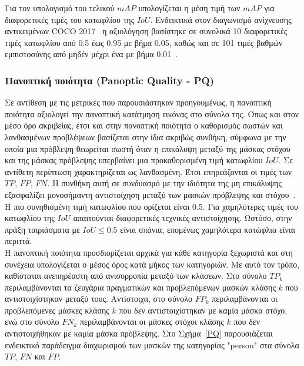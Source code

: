 \documentclass[12pt]{article}
\numberwithin{equation}{section}
\begin{document}
Για τον υπολογισμό του τελικού \(mAP\) υπολογίζεται η μέση τιμή των \(mAP\) για διαφορετικές τιμές του κατωφλίου της \(IoU\). Ενδεικτικά στον διαγωνισμό ανίχνευσης αντικειμένων COCO 2017~\cite{lin2015microsoftcococommonobjects} η αξιολόγηση βασίστηκε σε  συνολικά 10 διαφορετικές τιμές κατωφλίου από 0.5 έως 0.95 με βήμα 0.05, καθώς και σε 101 τιμές βαθμών εμπιστοσύνης από μηδέν μέχρι ένα με βήμα 0.01~\cite{shah2022map}. \\



\subsubsection{Πανοπτική ποιότητα (Panoptic Quality - PQ)}

Σε αντίθεση με τις μετρικές που παρουσιάστηκαν προηγουμένως, η πανοπτική ποιότητα αξιολογεί την πανοπτική κατάτμηση εικόνας στο σύνολο της. Όπως και στον μέσο όρο ακριβείας, έτσι και στην πανοπτική ποιότητα ο καθορισμός σωστών και λανθασμένων προβλέψεων βασίζεται στην ίδια ακριβώς συνθήκη, σύμφωνα με την οποία μια πρόβλεψη θεωρείται σωστή όταν η επικάλυψη μεταξύ της μάσκας στόχου και της μάσκας πρόβλεψης υπερβαίνει μια προκαθορισμένη τιμή κατωφλίου \(IoU\). Σε αντίθετη περίπτωση χαρακτηρίζεται ως λανθασμένη. Έτσι επηρεάζονται οι τιμές των \(TP\), \(FP\), \(FN\). Η συνθήκη αυτή σε συνδυασμό με την ιδιότητα της μη επικάλυψης εξασφαλίζει μονοσήμαντη αντιστοίχηση μεταξύ των μασκών πρόβλεψης και στόχου~\cite{Kirillov_2019_CVPR}.\\

Η πιο συνηθισμένη τιμή κατωφλίου που ορίζεται είναι 0.5. Για χαμηλότερες τιμές του κατωφλίου της \(IoU\) απαιτούνται διαφορετικές τεχνικές αντιστοίχησης. Ωστόσο, στην πράξη ταιριάσματα με \(IoU \leq 0.5 \) είναι σπάνια, επομένως χαμηλότερα κατώφλια είναι περιττά. \\

Η πανοπτική ποιότητα προσδιορίζεται αρχικά για κάθε κατηγορία ξεχωριστά και στη συνέχεια υπολογίζεται ο μέσος όρος κατά μήκος των κατηγοριών. Με αυτό τον τρόπο, καθίσταται ανεπηρέαστη από ανισορροπία μεταξύ των κλάσεων. Στο σύνολο \(TP_k\) περιλαμβάνονται τα ζευγάρια πραγματικών και προβλεπόμενων μασκών κλάσης \(k\) που αντιστοιχίστηκαν μεταξύ τους. Αντίστοιχα, στο σύνολο \(FP_k\) περιλαμβάνονται οι προβλεπόμενες μάσκες κλάσης \(k\) που δεν αντιστοιχίστηκαν με καμία μάσκα στόχο, ενώ στο σύνολο \(FN_k\) περιλαμβάνονται οι μάσκες στόχοι κλάσης \(k\) που δεν αντιστοιχήθηκαν με καμία μάσκα πρόβλεψης. Στο Σχήμα~\ref{PQ} παρουσιάζεται ενδεικτικό παράδειγμα διαχωρισμού των μασκών της κατηγορίας "person" στα σύνολα \(TP\), \(FN\) και \(FP\). \\
\end{document}
